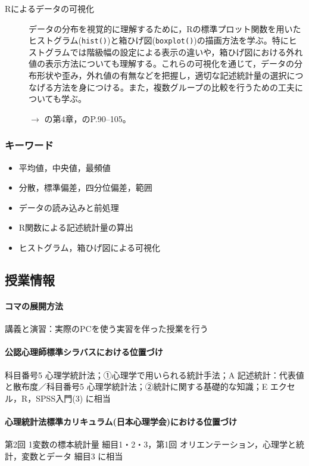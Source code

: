 \begin{description}
	\item[Rによるデータの可視化] データの分布を視覚的に理解するために，Rの標準プロット関数を用いたヒストグラム(\texttt{hist()})と箱ひげ図(\texttt{boxplot()})の描画方法を学ぶ。特にヒストグラムでは階級幅の設定による表示の違いや，箱ひげ図における外れ値の表示方法についても理解する。これらの可視化を通じて，データの分布形状や歪み，外れ値の有無などを把握し，適切な記述統計量の選択につなげる方法を身につける。また，複数グループの比較を行うための工夫についても学ぶ。
	      \begin{flushright}
		      $\to$ \textcite{Kinosady2021}の第4章，\textcite{kosugi2019}のP.90--105。
	      \end{flushright}

\end{description}
\subsubsection{キーワード}
\begin{itemize}
	\item 平均値，中央値，最頻値
	\item 分散，標準偏差，四分位偏差，範囲
	\item データの読み込みと前処理
	\item R関数による記述統計量の算出
	\item ヒストグラム，箱ひげ図による可視化
\end{itemize}
\subsection{授業情報}
\paragraph{コマの展開方法}
講義と演習：実際のPCを使う実習を伴った授業を行う
\paragraph{公認心理師標準シラバスにおける位置づけ}
科目番号5 心理学統計法；①心理学で用いられる統計手法；A 記述統計：代表値と散布度／科目番号5 心理学統計法；②統計に関する基礎的な知識；E エクセル，R，SPSS入門(3) に相当
\paragraph{心理統計法標準カリキュラム(日本心理学会)における位置づけ}
第2回 1変数の標本統計量 細目1・2・3，第1回 オリエンテーション，心理学と統計，変数とデータ 細目3 に相当
